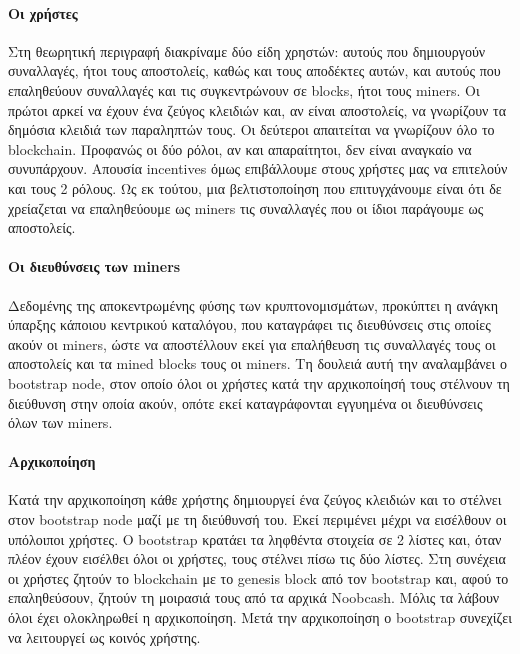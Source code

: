 \documentclass[titlepage]{article}
\begin{document}
\paragraph{Οι χρήστες}

Στη θεωρητική περιγραφή διακρίναμε δύο είδη χρηστών: αυτούς που δημιουργούν συναλλαγές, ήτοι τους αποστολείς, καθώς και τους αποδέκτες αυτών, και αυτούς που επαληθεύουν συναλλαγές και τις συγκεντρώνουν σε blocks, ήτοι τους miners. Οι πρώτοι αρκεί να έχουν ένα ζεύγος κλειδιών και, αν είναι αποστολείς, να γνωρίζουν τα δημόσια κλειδιά των παραληπτών τους. Οι δεύτεροι απαιτείται να γνωρίζουν όλο το blockchain. Προφανώς οι δύο ρόλοι, αν και απαραίτητοι, δεν είναι αναγκαίο να συνυπάρχουν. Απουσία incentives όμως επιβάλλουμε στους χρήστες μας να επιτελούν και τους 2 ρόλους. Ως εκ τούτου, μια βελτιστοποίηση που επιτυγχάνουμε είναι ότι δε χρείαζεται να επαληθεύουμε ως miners τις συναλλαγές που οι ίδιοι παράγουμε ως αποστολείς.

\paragraph{Οι διευθύνσεις των miners}

Δεδομένης της αποκεντρωμένης φύσης των κρυπτονομισμάτων, προκύπτει η ανάγκη ύπαρξης κάποιου κεντρικού καταλόγου, που καταγράφει τις διευθύνσεις στις οποίες ακούν οι miners, ώστε να αποστέλλουν εκεί για επαλήθευση τις συναλλαγές τους οι αποστολείς και τα mined blocks τους οι miners. Τη δουλειά αυτή την αναλαμβάνει ο bootstrap node, στον οποίο όλοι οι χρήστες κατά την αρχικοποίησή τους στέλνουν τη διεύθυνση στην οποία ακούν, οπότε εκεί καταγράφονται εγγυημένα οι διευθύνσεις όλων των miners.

\paragraph{Αρχικοποίηση}

Κατά την αρχικοποίηση κάθε χρήστης δημιουργεί ένα ζεύγος κλειδιών και το στέλνει στον bootstrap node μαζί με τη διεύθυνσή του. Εκεί περιμένει μέχρι να εισέλθουν οι υπόλοιποι χρήστες. Ο bootstrap κρατάει τα ληφθέντα στοιχεία σε 2 λίστες και, όταν πλέον έχουν εισέλθει όλοι οι χρήστες, τους στέλνει πίσω τις δύο λίστες. Στη συνέχεια οι χρήστες ζητούν το blockchain με το genesis block από τον bootstrap και, αφού το επαληθεύσουν, ζητούν τη μοιρασιά τους από τα αρχικά Noobcash. Μόλις τα λάβουν όλοι έχει ολοκληρωθεί η αρχικοποίηση. Μετά την αρχικοποίηση ο bootstrap συνεχίζει να λειτουργεί ως κοινός χρήστης.
\end{document}
